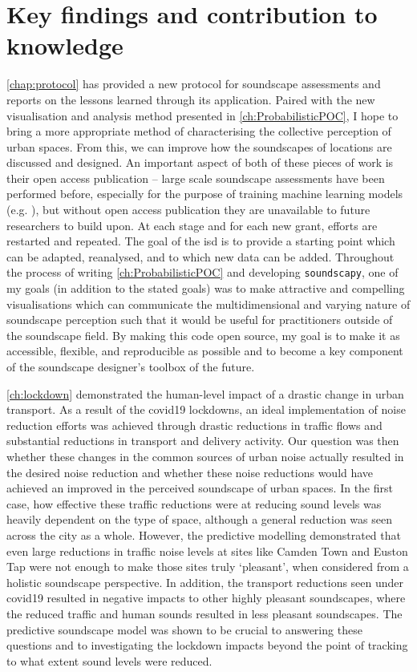 \section{Key findings and contribution to knowledge}
\cref{chap:protocol} has provided a new protocol for soundscape assessments and reports on the lessons learned through its application. Paired with the new visualisation and analysis method presented in \cref{ch:ProbabilisticPOC}, I hope to bring a more appropriate method of characterising the collective perception of urban spaces. From this, we can improve how the soundscapes of locations are discussed and designed. An important aspect of both of these pieces of work is their open access publication -- large scale soundscape assessments have been performed before, especially for the purpose of training machine learning models (e.g. \citep{Yu2009Modeling}), but without open access publication they are unavailable to future researchers to build upon. At each stage and for each new grant, efforts are restarted and repeated. The goal of the \gls{isd} is to provide a starting point which can be adapted, reanalysed, and to which new data can be added. Throughout the process of writing \cref{ch:ProbabilisticPOC} and developing \texttt{soundscapy}, one of my goals (in addition to the stated goals) was to make attractive and compelling visualisations which can communicate the multidimensional and varying nature of soundscape perception such that it would be useful for practitioners outside of the soundscape field. By making this code open source, my goal is to make it as accessible, flexible, and reproducible as possible and to become a key component of the soundscape designer's toolbox of the future. 

\cref{ch:lockdown} demonstrated the human-level impact of a drastic change in urban transport. As a result of the \gls{covid19} lockdowns, an ideal implementation of noise reduction efforts was achieved through drastic reductions in traffic flows and substantial reductions in transport and delivery activity. Our question was then whether these changes in the common sources of urban noise actually resulted in the desired noise reduction and whether these noise reductions would have achieved an improved in the perceived soundscape of urban spaces. In the first case, how effective these traffic reductions were at reducing sound levels was heavily dependent on the type of space, although a general reduction was seen across the city as a whole. However, the predictive modelling demonstrated that even large reductions in traffic noise levels at sites like Camden Town and Euston Tap were not enough to make those sites truly `pleasant', when considered from a holistic soundscape perspective. In addition, the transport reductions seen under \gls{covid19} resulted in negative impacts to other highly pleasant soundscapes, where the reduced traffic and human sounds resulted in less pleasant soundscapes. The predictive soundscape model was shown to be crucial to answering these questions and to investigating the lockdown impacts beyond the point of tracking to what extent sound levels were reduced.

